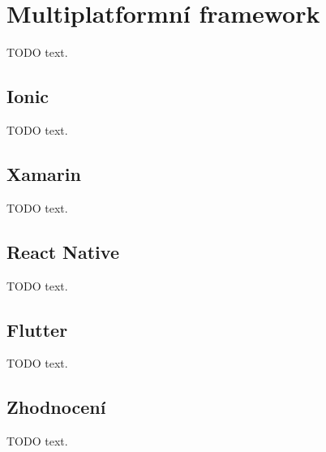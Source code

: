 \section{Multiplatformní framework}

TODO text.

\subsection{Ionic}

TODO text.

\subsection{Xamarin}

TODO text.

\subsection{React Native}

TODO text.

\subsection{Flutter}

TODO text.

\subsection{Zhodnocení}

TODO text.
